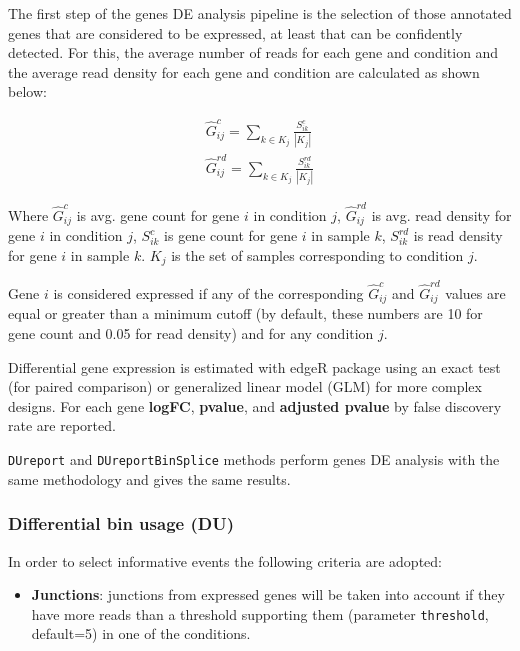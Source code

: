 \documentclass{article}
\begin{document}
The first step of the genes DE analysis pipeline is the selection of those
annotated genes that are considered to be expressed, at least that can be
confidently detected. For this, the average number of reads for each gene
and condition and the average read density for each gene and condition are
calculated as shown below:

\begin{eqnarray*}
   \hat G^{c}_{ij} = \sum_{k \in K_j} \frac{ S^{c}_{ik} }{ |K_j| } \\
   \hat G^{rd}_{ij} = \sum_{k \in K_j} \frac{ S^{rd}_{ik} }{ |K_j| }
   \label{eq:genByCond}
\end{eqnarray*}

Where $\hat G^{c}_{ij}$ is avg. gene count for gene $i$ in condition $j$,
$\hat G^{rd}_{ij}$ is avg. read density for gene $i$ in condition $j$, $S^{c}_{ik}$
is gene count for gene $i$ in sample $k$, $S^{rd}_{ik}$ is read density for
gene $i$ in sample $k$. $K_j$ is the set of samples corresponding to condition $j$.

Gene $i$ is considered expressed if any of the corresponding $\hat G^{c}_{ij}$
and $\hat G^{rd}_{ij}$ values are equal or greater than a minimum cutoff (by 
default, these numbers are 10 for gene count and 0.05 for read density) and for
any condition $j$.

Differential gene expression is estimated with edgeR \cite{Robinson2012} 
package using an exact test (for paired comparison) or generalized linear model
(GLM) for more complex designs. For each gene \textbf{logFC}, \textbf{pvalue},
and \textbf{adjusted  pvalue} by false discovery rate \cite{fdr} are reported. 

\texttt{DUreport} and \texttt{DUreportBinSplice} methods perform genes DE
analysis with the same methodology and gives the same results.


\subsubsection{Differential bin usage (DU)}
In order to select informative events the following criteria are adopted:
  
\begin{itemize}
\item \textbf{Junctions}: junctions from expressed genes will be taken into account if they have more reads than a threshold supporting them (parameter \texttt{threshold}, default=5) in one of the conditions. 
\end{itemize}
\end{document}
